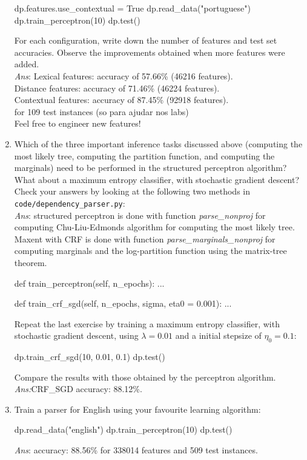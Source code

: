 \begin{exercise}
\begin{enumerate}
\begin{python}
dp.features.use_contextual = True
dp.read_data("portuguese")
dp.train_perceptron(10)
dp.test()
\end{python}
For each configuration, write down the number of features and test set accuracies. 
Observe the improvements obtained when more features were added.\\
{\emph{Ans}: Lexical features: accuracy of 57.66\% (46216 features).\\
Distance features: accuracy of 71.46\% (46224 features).\\
Contextual features: accuracy of 87.45\% (92918 features).\\
for 109 test instances (so para ajudar nos labs)}\\
Feel free to engineer new features!

\item Which of the three important inference tasks discussed above (computing the most likely tree, 
computing the partition function, and computing the marginals) need to be performed in the structured perceptron algorithm? 
What about a maximum entropy classifier, with stochastic gradient descent?  
Check your answers by looking at the following two methods in {\tt code/dependency\_parser.py}:\\
{\emph{Ans}: structured perceptron is done with function \emph{parse\_nonproj} for computing Chu-Liu-Edmonds algorithm for computing the most likely tree.\\
Maxent with CRF is done with function \emph{parse\_marginals\_nonproj} for computing marginals and the log-partition function using the matrix-tree theorem.}
\begin{python}
def train_perceptron(self, n_epochs):
...

def train_crf_sgd(self, n_epochs, sigma, eta0 = 0.001):
...
\end{python}
Repeat the last exercise by training a maximum entropy classifier, with stochastic gradient descent, 
using $\lambda = 0.01$ and a initial stepsize of $\eta_0 = 0.1$: 
\begin{python}
dp.train_crf_sgd(10, 0.01, 0.1)
dp.test()
\end{python}
Compare the results with those obtained by the perceptron algorithm.\\
{\emph{Ans:}CRF\_SGD accuracy: 88.12\%.}

\item Train a parser for English using your favourite learning algorithm: 
\begin{python}
dp.read_data("english")
dp.train_perceptron(10)
dp.test()
\end{python}
{\emph{Ans}: accuracy: 88.56\% for 338014 features and 509 test instances.}\\


\end{enumerate}
\end{exercise}
